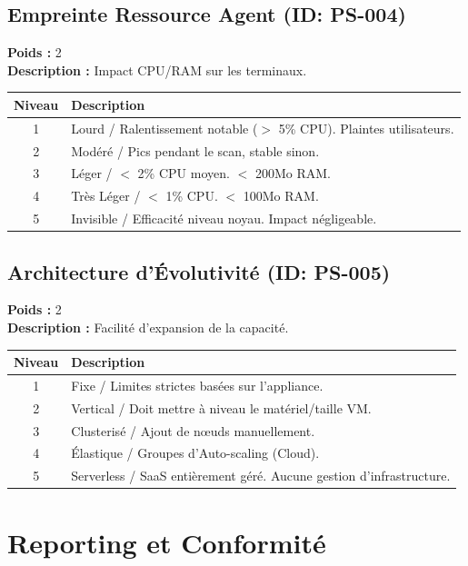\documentclass{article}
\begin{document}
\subsection{Empreinte Ressource Agent (ID: PS-004)}
\textbf{Poids :} 2 \\
\textbf{Description :} Impact CPU/RAM sur les terminaux.
\vspace{0.3cm}
\begin{longtable}{|c|p{12cm}|}
\hline
\rowcolor{lightgray} \textbf{Niveau} & \textbf{Description} \\ \hline
1 & Lourd / Ralentissement notable ($>$ 5\% CPU). Plaintes utilisateurs. \\ \hline
2 & Modéré / Pics pendant le scan, stable sinon. \\ \hline
3 & Léger / $<$ 2\% CPU moyen. $<$ 200Mo RAM. \\ \hline
4 & Très Léger / $<$ 1\% CPU. $<$ 100Mo RAM. \\ \hline
5 & Invisible / Efficacité niveau noyau. Impact négligeable. \\ \hline
\end{longtable}
\vspace{0.5cm}
\subsection{Architecture d'Évolutivité (ID: PS-005)}
\textbf{Poids :} 2 \\
\textbf{Description :} Facilité d'expansion de la capacité.
\vspace{0.3cm}
\begin{longtable}{|c|p{12cm}|}
\hline
\rowcolor{lightgray} \textbf{Niveau} & \textbf{Description} \\ \hline
1 & Fixe / Limites strictes basées sur l'appliance. \\ \hline
2 & Vertical / Doit mettre à niveau le matériel/taille VM. \\ \hline
3 & Clusterisé / Ajout de nœuds manuellement. \\ \hline
4 & Élastique / Groupes d'Auto-scaling (Cloud). \\ \hline
5 & Serverless / SaaS entièrement géré. Aucune gestion d'infrastructure. \\ \hline
\end{longtable}
\vspace{0.5cm}
\section{Reporting et Conformité}
\end{document}
